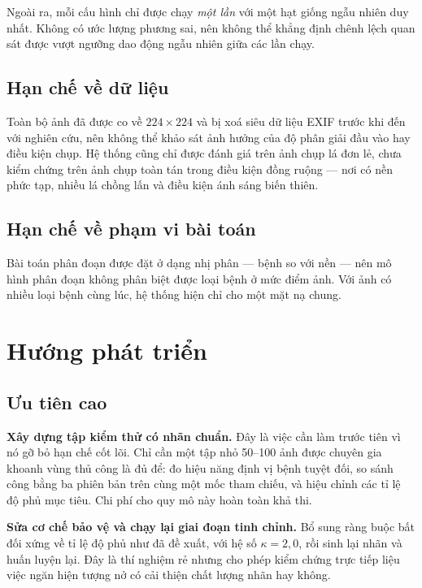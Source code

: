 Ngoài ra, mỗi cấu hình chỉ được chạy \emph{một lần} với một hạt giống ngẫu nhiên
duy nhất. Không có ước lượng phương sai, nên không thể khẳng định chênh lệch quan
sát được vượt ngưỡng dao động ngẫu nhiên giữa các lần chạy.

\subsection{Hạn chế về dữ liệu}

Toàn bộ ảnh đã được co về $224 \times 224$ và bị xoá siêu dữ liệu EXIF trước khi
đến với nghiên cứu, nên không thể khảo sát ảnh hưởng của độ phân giải đầu vào hay
điều kiện chụp. Hệ thống cũng chỉ được đánh giá trên ảnh chụp lá đơn lẻ, chưa kiểm
chứng trên ảnh chụp toàn tán trong điều kiện đồng ruộng --- nơi có nền phức tạp,
nhiều lá chồng lấn và điều kiện ánh sáng biến thiên.

\subsection{Hạn chế về phạm vi bài toán}

Bài toán phân đoạn được đặt ở dạng nhị phân --- bệnh so với nền --- nên mô hình
phân đoạn không phân biệt được loại bệnh ở mức điểm ảnh. Với ảnh có nhiều loại
bệnh cùng lúc, hệ thống hiện chỉ cho một mặt nạ chung.

\section{Hướng phát triển}

\subsection{Ưu tiên cao}

\textbf{Xây dựng tập kiểm thử có nhãn chuẩn.} Đây là việc cần làm trước tiên vì nó
gỡ bỏ hạn chế cốt lõi. Chỉ cần một tập nhỏ 50--100 ảnh được chuyên gia khoanh vùng
thủ công là đủ để: đo hiệu năng định vị bệnh tuyệt đối, so sánh công bằng ba phiên
bản trên cùng một mốc tham chiếu, và hiệu chỉnh các tỉ lệ độ phủ mục tiêu. Chi phí
cho quy mô này hoàn toàn khả thi.

\textbf{Sửa cơ chế bảo vệ và chạy lại giai đoạn tinh chỉnh.} Bổ sung ràng buộc bất
đối xứng về tỉ lệ độ phủ như đã đề xuất, với hệ số $\kappa = 2{,}0$, rồi sinh lại
nhãn và huấn luyện lại. Đây là thí nghiệm rẻ nhưng cho phép kiểm chứng trực tiếp
liệu việc ngăn hiện tượng nở có cải thiện chất lượng nhãn hay không.


